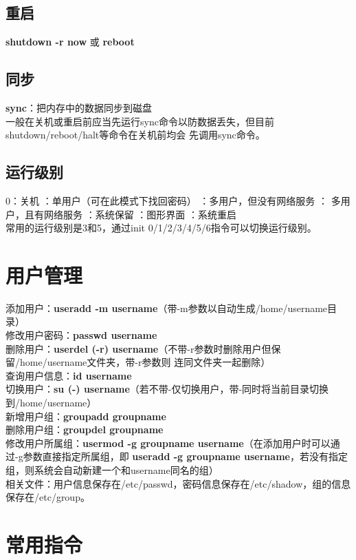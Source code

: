 \documentclass[11pt]{article}
\begin{document}
\subsection{重启}
\textbf{shutdown -r now} \quad 或 \quad \textbf{reboot}

\subsection{同步}
\textbf{sync}：把内存中的数据同步到磁盘  \\
一般在关机或重启前应当先运行sync命令以防数据丢失，但目前shutdown/reboot/halt等命令在关机前均会
先调用sync命令。

\subsection{运行级别}
0：关机 ：单用户（可在此模式下找回密码） ：多用户，但没有网络服务 ：
多用户，且有网络服务 ：系统保留 ：图形界面 ：系统重启  \\
常用的运行级别是3和5，通过init 0/1/2/3/4/5/6指令可以切换运行级别。

\section{用户管理}
添加用户：\textbf{useradd -m username}（带-m参数以自动生成/home/username目录） \\
修改用户密码：\textbf{passwd username} \\
删除用户：\textbf{userdel (-r) username}（不带-r参数时删除用户但保留/home/username文件夹，带-r参数则
连同文件夹一起删除） \\
查询用户信息：\textbf{id username} \\
切换用户：\textbf{su (-) username}（若不带-仅切换用户，带-同时将当前目录切换到/home/username） \\
新增用户组：\textbf{groupadd groupname} \\
删除用户组：\textbf{groupdel groupname} \\
修改用户所属组：\textbf{usermod -g groupname username}（在添加用户时可以通过-g参数直接指定所属组，即
\textbf{useradd -g groupname username}，若没有指定组，则系统会自动新建一个和username同名的组） \\
相关文件：用户信息保存在/etc/passwd，密码信息保存在/etc/shadow，组的信息保存在/etc/group。

\section{常用指令}
\end{document}
